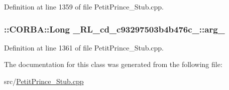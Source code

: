 Definition at line 1359 of file Petit\+Prince\+\_\+\+Stub.\+cpp.

\subsubsection[{\texorpdfstring{arg\+\_\+0}{arg_0}}]{\setlength{\rightskip}{0pt plus 5cm}\+::C\+O\+R\+B\+A\+::\+Long \+\_\+R\+L\+\_\+cd\+\_\+c93297503b4b476c\+\_\+::arg\+\_}\hypertarget{class__0_r_l__cd__c93297503b4b476c__80000000_a4c028c6d9f97e31f6f1c2daea15de53d}{}\label{class__0_r_l__cd__c93297503b4b476c__80000000_a4c028c6d9f97e31f6f1c2daea15de53d}


Definition at line 1361 of file Petit\+Prince\+\_\+\+Stub.\+cpp.



The documentation for this class was generated from the following file\+:\begin{DoxyCompactItemize}
\item 
src/\hyperlink{_petit_prince___stub_8cpp}{Petit\+Prince\+\_\+\+Stub.\+cpp}\end{DoxyCompactItemize}
